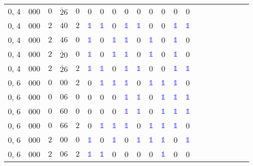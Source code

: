 \begin{longtable*}{c| cccccccccccccccccccc }
0, 4& 000& $0$& $\bar{2}6$& $0$& 0& 0& 0& 0& 0& 0& 0& 0& 0\\
0, 4& 000& $2$& $40$& $2$& \textcolor{blue}{$\mathds{1}$}& \textcolor{blue}{$\mathds{1}$}& 0& \textcolor{blue}{$\mathds{1}$}& \textcolor{blue}{$\mathds{1}$}& 0& 0& \textcolor{blue}{$\mathds{1}$}& \textcolor{blue}{$\mathds{1}$}\\
0, 4& 000& $2$& $46$& $0$& \textcolor{blue}{$\mathds{1}$}& 0& \textcolor{blue}{$\mathds{1}$}& \textcolor{blue}{$\mathds{1}$}& 0& \textcolor{blue}{$\mathds{1}$}& 0& \textcolor{blue}{$\mathds{1}$}& 0\\
0, 4& 000& $2$& $\bar{2}0$& $0$& \textcolor{blue}{$\mathds{1}$}& 0& \textcolor{blue}{$\mathds{1}$}& \textcolor{blue}{$\mathds{1}$}& 0& \textcolor{blue}{$\mathds{1}$}& 0& \textcolor{blue}{$\mathds{1}$}& 0\\
0, 4& 000& $2$& $\bar{2}6$& $2$& \textcolor{blue}{$\mathds{1}$}& \textcolor{blue}{$\mathds{1}$}& 0& \textcolor{blue}{$\mathds{1}$}& \textcolor{blue}{$\mathds{1}$}& 0& 0& \textcolor{blue}{$\mathds{1}$}& \textcolor{blue}{$\mathds{1}$}\\
0, 6& 000& $0$& $00$& $2$& 0& \textcolor{blue}{$\mathds{1}$}& \textcolor{blue}{$\mathds{1}$}& \textcolor{blue}{$\mathds{1}$}& 0& \textcolor{blue}{$\mathds{1}$}& \textcolor{blue}{$\mathds{1}$}& \textcolor{blue}{$\mathds{1}$}& 0\\
0, 6& 000& $0$& $06$& $0$& 0& 0& 0& \textcolor{blue}{$\mathds{1}$}& \textcolor{blue}{$\mathds{1}$}& 0& \textcolor{blue}{$\mathds{1}$}& \textcolor{blue}{$\mathds{1}$}& \textcolor{blue}{$\mathds{1}$}\\
0, 6& 000& $0$& $60$& $0$& 0& 0& 0& \textcolor{blue}{$\mathds{1}$}& \textcolor{blue}{$\mathds{1}$}& 0& \textcolor{blue}{$\mathds{1}$}& \textcolor{blue}{$\mathds{1}$}& \textcolor{blue}{$\mathds{1}$}\\
0, 6& 000& $0$& $66$& $2$& 0& \textcolor{blue}{$\mathds{1}$}& \textcolor{blue}{$\mathds{1}$}& \textcolor{blue}{$\mathds{1}$}& 0& \textcolor{blue}{$\mathds{1}$}& \textcolor{blue}{$\mathds{1}$}& \textcolor{blue}{$\mathds{1}$}& 0\\
0, 6& 000& $2$& $00$& $0$& \textcolor{blue}{$\mathds{1}$}& 0& \textcolor{blue}{$\mathds{1}$}& 0& \textcolor{blue}{$\mathds{1}$}& \textcolor{blue}{$\mathds{1}$}& \textcolor{blue}{$\mathds{1}$}& 0& \textcolor{blue}{$\mathds{1}$}\\
0, 6& 000& $2$& $06$& $2$& \textcolor{blue}{$\mathds{1}$}& \textcolor{blue}{$\mathds{1}$}& 0& 0& 0& 0& \textcolor{blue}{$\mathds{1}$}& 0& 0\\

\end{longtable*}
